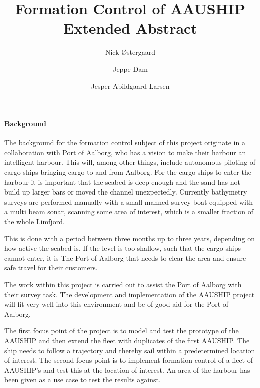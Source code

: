 \documentclass[a4paper,12pt]{article}
\begin{document}
\title{\vspace{-2cm}Formation Control of AAUSHIP\\
\vspace{0.3cm}\small{Extended Abstract}}
\author{Nick Østergaard \and Jeppe Dam \and Jesper Abildgaard Larsen}
\maketitle


\paragraph{Background}
The background for the formation control subject of this project
originate in a collaboration with Port of Aalborg, who has a vision to
make their harbour an intelligent harbour. This will, among other
things, include autonomous piloting of cargo ships bringing cargo to and from
Aalborg. For the cargo ships to enter the harbour it is important that
the seabed is deep enough and the sand has not build up larger bars or
moved the channel unexpectedly.  Currently bathymetry surveys are
performed manually with a small manned survey boat equipped with a
multi beam sonar, scanning some area of interest, which is a smaller
fraction of the whole Limfjord.

This is done with a period between three months up to three years,
depending on how active the seabed is. If the level is too shallow,
such that the cargo ships cannot enter, it is The Port of Aalborg that
needs to clear the area and ensure safe travel for their customers.

The work within this project is carried out to assist the Port of
Aalborg with their survey task. The development and implementation of
the AAUSHIP project will fit very well into this environment and be of
good aid for the Port of Aalborg.

The first focus point of the project is to model and test the
prototype of the AAUSHIP and then extend the fleet with duplicates of
the first AAUSHIP. The ship needs to follow a trajectory and thereby
sail within a predetermined location of interest. The second focus
point is to implement formation control of a fleet of AAUSHIP's and
test this at the location of interest. An area of the harbour has been
given as a use case to test the results against.
\end{document}
